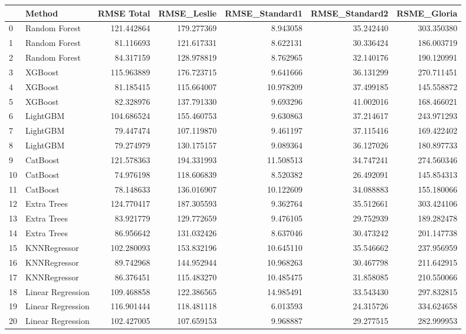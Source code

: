 \begin{tabular}{llrrrrr}
\toprule
{} &             Method &  RMSE Total &  RMSE\_Leslie &  RMSE\_Standard1 &  RMSE\_Standard2 &  RSME\_Gloria \\
\midrule
0  &      Random Forest &  121.442864 &   179.277369 &        8.943058 &       35.242440 &   303.350380 \\
1  &      Random Forest &   81.116693 &   121.617331 &        8.622131 &       30.336424 &   186.003719 \\
2  &      Random Forest &   84.317159 &   128.978819 &        8.762965 &       32.140176 &   190.120991 \\
3  &            XGBoost &  115.963889 &   176.723715 &        9.641666 &       36.131299 &   270.711451 \\
4  &            XGBoost &   81.185415 &   115.664007 &       10.978209 &       37.499185 &   145.558872 \\
5  &            XGBoost &   82.328976 &   137.791330 &        9.693296 &       41.002016 &   168.466021 \\
6  &           LightGBM &  104.686524 &   155.460753 &        9.630863 &       37.214617 &   243.971293 \\
7  &           LightGBM &   79.447474 &   107.119870 &        9.461197 &       37.115416 &   169.422402 \\
8  &           LightGBM &   79.274979 &   130.175157 &        9.089364 &       36.127026 &   180.897733 \\
9  &           CatBoost &  121.578363 &   194.331993 &       11.508513 &       34.747241 &   274.560346 \\
10 &           CatBoost &   74.976198 &   118.606839 &        8.520382 &       26.492091 &   145.854313 \\
11 &           CatBoost &   78.148633 &   136.016907 &       10.122609 &       34.088883 &   155.180066 \\
12 &        Extra Trees &  124.770417 &   187.305593 &        9.362764 &       35.512661 &   303.424106 \\
13 &        Extra Trees &   83.921779 &   129.772659 &        9.476105 &       29.752939 &   189.282478 \\
14 &        Extra Trees &   86.956642 &   131.032426 &        8.637046 &       30.473242 &   201.147738 \\
15 &       KNNRegressor &  102.280093 &   153.832196 &       10.645110 &       35.546662 &   237.956959 \\
16 &       KNNRegressor &   89.742968 &   144.952944 &       10.968263 &       30.467798 &   211.642915 \\
17 &       KNNRegressor &   86.376451 &   115.483270 &       10.485475 &       31.858085 &   210.550066 \\
18 &  Linear Regression &  109.468858 &   122.386565 &       14.985491 &       33.543430 &   297.832815 \\
19 &  Linear Regression &  116.901444 &   118.481118 &        6.013593 &       24.315726 &   334.624658 \\
20 &  Linear Regression &  102.427005 &   107.659153 &        9.968887 &       29.277515 &   282.999953 \\
\bottomrule
\end{tabular}
